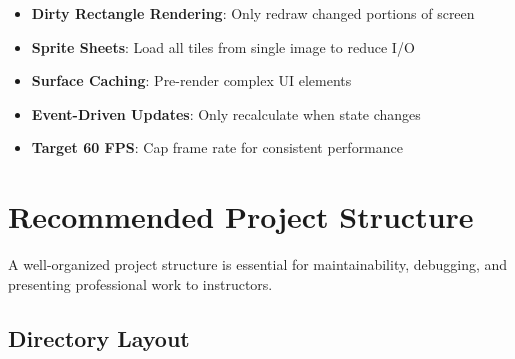 \documentclass[12pt,a4paper]{article}
\begin{document}
\begin{itemize}
    \item \textbf{Dirty Rectangle Rendering}: Only redraw changed portions of screen
    \item \textbf{Sprite Sheets}: Load all tiles from single image to reduce I/O
    \item \textbf{Surface Caching}: Pre-render complex UI elements
    \item \textbf{Event-Driven Updates}: Only recalculate when state changes
    \item \textbf{Target 60 FPS}: Cap frame rate for consistent performance
\end{itemize}

\section{Recommended Project Structure}

A well-organized project structure is essential for maintainability, debugging, and presenting professional work to instructors.

\subsection{Directory Layout}
\end{document}
